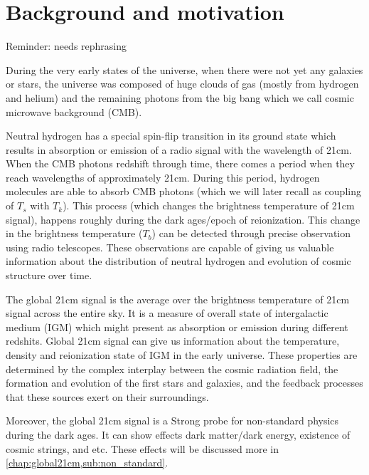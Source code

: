 \documentclass[12pt, TexShade, letterpaper]{report}
\begin{document}
\section{Background and motivation}
Reminder: needs rephrasing\par
During the very early states of the universe, when there were not yet any galaxies or stars, the universe was composed of huge clouds of gas (mostly from hydrogen and helium) and the remaining photons from the big bang which we call cosmic microwave background (CMB). \par
Neutral hydrogen has a special spin-flip transition in its ground state which results in absorption or emission of a radio signal with the wavelength of 21cm. When the CMB photons redshift through time, there comes a period when they reach wavelengths of approximately 21cm. During this period, hydrogen molecules are able to absorb CMB photons (which we will later recall as coupling of $T_s$ with $T_k$). This process (which changes the brightness temperature of 21cm signal), happens roughly during the dark ages/epoch of reionization. This change in the brightness temperature ($T_b$) can be detected through precise observation using radio telescopes. These observations are capable of giving us valuable information about the distribution of neutral hydrogen and evolution of cosmic structure over time\cite{low_frequency}.\par
The global 21cm signal is the average over the brightness temperature of 21cm signal across the entire sky. It is a measure of overall state of intergalactic medium (IGM) which might present as absorption or emission during different redshits. Global 21cm signal can give us information about the temperature, density and reionization state of IGM in the early universe. These properties are determined by the complex interplay between the cosmic radiation field, the formation and evolution of the first stars and galaxies, and the feedback processes that these sources exert on their surroundings\cite{21century}.\par
Moreover, the global 21cm signal is a Strong probe for non-standard physics during the dark ages. It can show effects dark matter/dark energy, existence of cosmic strings, and etc. These effects will be discussed more in \ref{chap:global21cm,sub:non_standard}.\par
\end{document}
